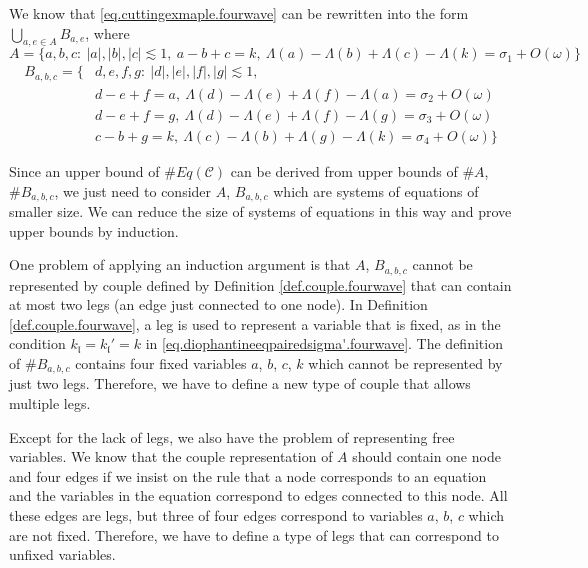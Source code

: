 We know that \eqref{eq.cuttingexmaple.fourwave} can be rewritten into the form $\bigcup_{a,e\in A} B_{a,e}$, where
\begin{equation}\label{eq.couplequationA.fourwave}
 A=\{a, b, c:\ |a|,|b|,|c|\lesssim 1,\ a - b + c = k,\ \Lambda(a) - \Lambda(b) + \Lambda(c) - \Lambda(k) =\sigma_{1} + O(\omega)\}
\end{equation}
\begin{equation}\label{eq.couplequationB.fourwave}
 \begin{split}
 B_{a,b,c}=\{&d, e, f, g:\ |d|,|e|,|f|,|g|\lesssim 1,
 \\
 &d - e + f = a,\ \Lambda(d) - \Lambda(e) + \Lambda(f) - \Lambda(a) =\sigma_{2} + O(\omega)
 \\
 &d - e + f = g,\ \Lambda(d) - \Lambda(e) + \Lambda(f) - \Lambda(g) =\sigma_{3} + O(\omega)
 \\
 &c - b + g = k,\ \Lambda(c) - \Lambda(b) + \Lambda(g) - \Lambda(k) =\sigma_{4} + O(\omega)\}
 \end{split} 
\end{equation}

Since an upper bound of $\# Eq(\mathcal{C})$ can be derived from upper bounds of $\# A$, $\# B_{a,b,c}$, we just need to consider $A$, $B_{a,b,c}$ which are systems of equations of smaller size. We can reduce the size of systems of equations in this way and prove upper bounds by induction.

One problem of applying an induction argument is that $A$, $B_{a,b,c}$ cannot be represented by couple defined by Definition \ref{def.couple.fourwave} that can contain at most two legs (an edge just connected to one node). In Definition \ref{def.couple.fourwave}, a leg is used to represent a variable that is fixed, as in the condition $k_{\mathfrak{l}} = k_{\mathfrak{l}}'= k$ in \eqref{eq.diophantineeqpairedsigma'.fourwave}. The definition of $\# B_{a,b,c}$ contains four fixed variables $a$, $b$, $c$, $k$ which cannot be represented by just two legs. Therefore, we have to define a new type of couple that allows multiple legs.

Except for the lack of legs, we also have the problem of representing free variables. We know that the couple representation of $A$ should contain one node and four edges if we insist on the rule that a node corresponds to an equation and the variables in the equation correspond to edges connected to this node. All these edges are legs, but three of four edges correspond to variables $a$, $b$, $c$ which are not fixed. Therefore, we have to define a type of legs that can correspond to unfixed variables.

